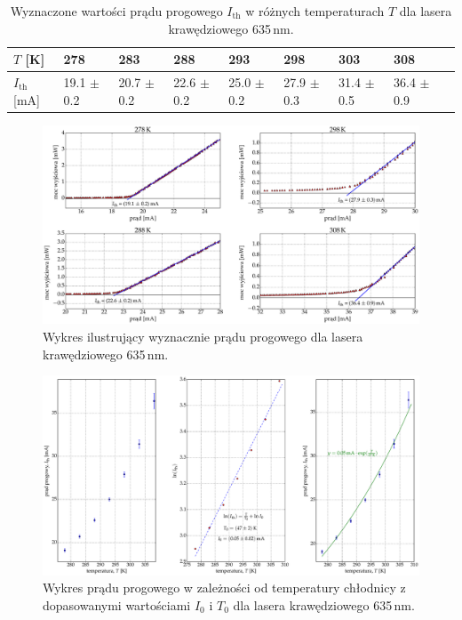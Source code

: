 \begin{table}[H]
\begin{center}
\caption{Wyznaczone wartości prądu progowego $I_{\mathrm{th}}$ w różnych temperaturach $T$ dla lasera krawędziowego 635\,nm. }
\begin{adjustbox}{max width=\textwidth}
\begin{tabular}{ | C{1.9cm}|  C{1.5cm} | C{1.9cm} | C{1.9cm}| C{1.9cm} | C{1.9cm}| C{1.9cm}| C{1.9cm}| C{2.0cm}|}
\hline
$T$ [K] 	&   278 & 283  	& 288 & 293 & 298 & 303 & 308 \\ \hline
$I_{\mathrm{th}}$ [mA]  &	19.1 $\pm$ 0.2  & 20.7 $\pm$ 0.2 & 22.6 $\pm$ 0.2 &
25.0 $\pm$ 0.2  & 27.9 $\pm$ 0.3 & 31.4 $\pm$ 0.5 & 36.4 $\pm$ 0.9	\\ \hline
\end{tabular}
\end{adjustbox}
\label{tab:tabela_635}
\end{center}
\end{table}
\begin{figure}[H]
\center
  \includegraphics[scale=0.30]{plot635/plot_i_th_4_2.eps}
  \caption{Wykres ilustrujący wyznacznie prądu progowego dla lasera krawędziowego 635\,nm.}
  \label{fig:plot_i_th_4}
\end{figure}
\begin{figure}
\center
  \includegraphics[scale=0.30]{plot635/plot_fit_2.eps}
  \caption{Wykres prądu progowego w zależności od temperatury chłodnicy z dopasowanymi wartościami $I_{0}$ i $T_{0}$ dla lasera krawędziowego 635\,nm.}
  \label{fig:plot_fit}
\end{figure}
